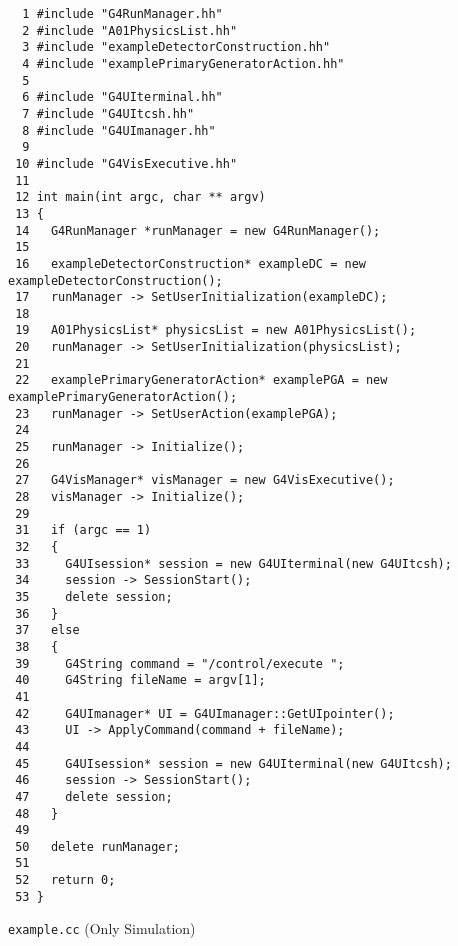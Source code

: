 \begin{code}[p]
\begin{lstlisting}
  1 #include "G4RunManager.hh"
  2 #include "A01PhysicsList.hh"
  3 #include "exampleDetectorConstruction.hh"
  4 #include "examplePrimaryGeneratorAction.hh"
  5 
  6 #include "G4UIterminal.hh"
  7 #include "G4UItcsh.hh"
  8 #include "G4UImanager.hh"
  9 
 10 #include "G4VisExecutive.hh"
 11 
 12 int main(int argc, char ** argv)
 13 {
 14   G4RunManager *runManager = new G4RunManager();
 15 
 16   exampleDetectorConstruction* exampleDC = new exampleDetectorConstruction();
 17   runManager -> SetUserInitialization(exampleDC);
 18 
 19   A01PhysicsList* physicsList = new A01PhysicsList();
 20   runManager -> SetUserInitialization(physicsList);
 21 
 22   examplePrimaryGeneratorAction* examplePGA = new examplePrimaryGeneratorAction();
 23   runManager -> SetUserAction(examplePGA);
 24 
 25   runManager -> Initialize();
 26 
 27   G4VisManager* visManager = new G4VisExecutive();
 28   visManager -> Initialize();
 29 
 31   if (argc == 1)
 32   {
 33     G4UIsession* session = new G4UIterminal(new G4UItcsh);
 34     session -> SessionStart();
 35     delete session;
 36   }
 37   else
 38   {
 39     G4String command = "/control/execute ";
 40     G4String fileName = argv[1];
 41 
 42     G4UImanager* UI = G4UImanager::GetUIpointer();
 43     UI -> ApplyCommand(command + fileName);
 44 
 45     G4UIsession* session = new G4UIterminal(new G4UItcsh);
 46     session -> SessionStart();
 47     delete session;
 48   }
 49 
 50   delete runManager;
 51 
 52   return 0;
 53 }
\end{lstlisting}
\caption{\texttt{example.cc} (Only Simulation) \label{code-3-12}}
\end{code}
